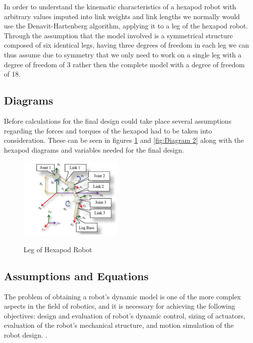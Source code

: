 In order to understand the kinematic characteristics of a hexapod robot with arbitrary values imputed into link weights and link lengths we normally would use the Denavit-Hartenberg algorithm, applying it to a leg of the hexapod robot. Through the assumption that the model involved is a symmetrical structure composed of six identical legs, having three degrees of freedom in each leg we can thus assume due to symmetry that we only need to work on a single leg with a degree of freedom of 3 rather then the complete model with a degree of freedom of 18.



\subsection{Diagrams}
Before calculations for the final design could take place several assumptions regarding the forces and torques of the hexapod had to be taken into consideration. These can be seen in figures \ref{fig: Diagram 1} and \ref{fig:Diagram 2} along with the hexapod diagrams and variables needed for  the final design.


\begin{figure}[h]

 \centering
   \includegraphics[width = 0.45\textwidth]{figures/11.png}            \caption{Leg of Hexapod Robot}
   \label{fig: Diagram 1}
   \cite{pullteap2013development}
\end{figure}



\subsection{Assumptions and Equations}

The problem of obtaining a robot’s dynamic model is one of the more complex aspects in the field of robotics, and it is necessary for achieving the following objectives: design and evaluation of robot’s dynamic control, sizing of actuators, evaluation of the robot’s mechanical structure, and motion simulation of the robot design.  
 \cite{pullteap2013development}.



